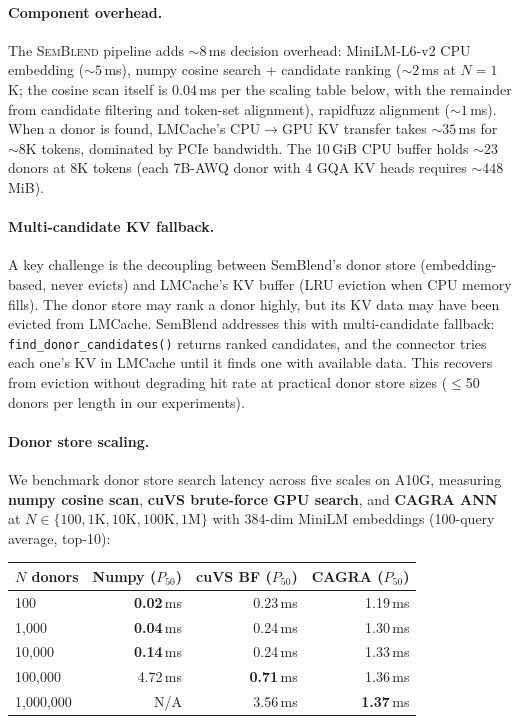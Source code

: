 \documentclass[10pt,twocolumn]{article}
\newcommand{\semblend}{\textsc{SemBlend}\xspace}
\begin{document}
\paragraph{Component overhead.}
The \semblend pipeline adds ${\sim}8$\,ms decision overhead:
MiniLM-L6-v2 CPU embedding (${\sim}5$\,ms), numpy cosine search +
candidate ranking (${\sim}2$\,ms at $N{=}1$K; the cosine scan itself
is 0.04\,ms per the scaling table below, with the remainder from
candidate filtering and token-set alignment), rapidfuzz alignment
(${\sim}1$\,ms).
When a donor is found, LMCache's CPU$\to$GPU KV transfer takes
${\sim}35$\,ms for ${\sim}8$K tokens, dominated by PCIe bandwidth.
The 10\,GiB CPU buffer holds ${\sim}23$ donors at 8K tokens
(each 7B-AWQ donor with 4 GQA KV heads requires ${\sim}448$\,MiB).

\paragraph{Multi-candidate KV fallback.}
A key challenge is the decoupling between SemBlend's donor store
(embedding-based, never evicts) and LMCache's KV buffer (LRU eviction
when CPU memory fills). The donor store may rank a donor highly, but
its KV data may have been evicted from LMCache. SemBlend addresses
this with multi-candidate fallback: \texttt{find\_donor\_candidates()}
returns ranked candidates, and the connector tries each one's KV in
LMCache until it finds one with available data. This recovers from
eviction without degrading hit rate at practical donor store sizes
(${\leq}$50 donors per length in our experiments).

\paragraph{Donor store scaling.}
We benchmark donor store search latency across five scales on A10G,
measuring \textbf{numpy cosine
scan}, \textbf{cuVS brute-force GPU search}, and \textbf{CAGRA ANN}
at $N \in \{100, 1\text{K}, 10\text{K}, 100\text{K}, 1\text{M}\}$
with 384-dim MiniLM embeddings (100-query average, top-10):

\begin{center}
\small
\setlength{\tabcolsep}{3pt}
\begin{tabular}{@{}lrrr@{}}
\toprule
$N$ donors & Numpy ($P_{50}$) & cuVS BF ($P_{50}$) & CAGRA ($P_{50}$) \\
\midrule
100            & \textbf{0.02}\,ms & 0.23\,ms & 1.19\,ms \\
1{,}000        & \textbf{0.04}\,ms & 0.24\,ms & 1.30\,ms \\
10{,}000       & \textbf{0.14}\,ms & 0.24\,ms & 1.33\,ms \\
100{,}000      & 4.72\,ms & \textbf{0.71}\,ms & 1.36\,ms \\
1{,}000{,}000  & N/A & 3.56\,ms & \textbf{1.37}\,ms \\
\bottomrule
\end{tabular}
\end{center}
\end{document}
